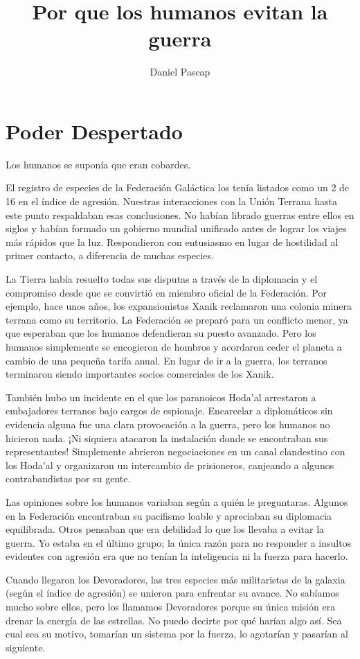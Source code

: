 \documentclass[spanish,12pt,a4paper,oneside,titlepage]{book}
\title{Por que los humanos evitan la guerra}
\author{Daniel Pascap}
\begin{document}
    \maketitle
    \tableofcontents
    \chapter{Poder Despertado}
    Los humanos se suponía que eran cobardes.

    El registro de especies de la Federación Galáctica los tenía listados como un 2 de 16 en el índice de agresión. Nuestras interacciones con la Unión Terrana hasta este punto respaldaban esas conclusiones. No habían librado guerras entre ellos en siglos y habían formado un gobierno mundial unificado antes de lograr los viajes más rápidos que la luz. Respondieron con entusiasmo en lugar de hostilidad al primer contacto, a diferencia de muchas especies.

    La Tierra había resuelto todas sus disputas a través de la diplomacia y el compromiso desde que se convirtió en miembro oficial de la Federación. Por ejemplo, hace unos años, los expansionistas Xanik reclamaron una colonia minera terrana como su territorio. La Federación se preparó para un conflicto menor, ya que esperaban que los humanos defendieran su puesto avanzado. Pero los humanos simplemente se encogieron de hombros y acordaron ceder el planeta a cambio de una pequeña tarifa anual. En lugar de ir a la guerra, los terranos terminaron siendo importantes socios comerciales de los Xanik.

    También hubo un incidente en el que los paranoicos Hoda'al arrestaron a embajadores terranos bajo cargos de espionaje. Encarcelar a diplomáticos sin evidencia alguna fue una clara provocación a la guerra, pero los humanos no hicieron nada. ¡Ni siquiera atacaron la instalación donde se encontraban sus representantes! Simplemente abrieron negociaciones en un canal clandestino con los Hoda'al y organizaron un intercambio de prisioneros, canjeando a algunos contrabandistas por su gente.

    Las opiniones sobre los humanos variaban según a quién le preguntaras. Algunos en la Federación encontraban su pacifismo loable y apreciaban su diplomacia equilibrada. Otros pensaban que era debilidad lo que los llevaba a evitar la guerra. Yo estaba en el último grupo; la única razón para no responder a insultos evidentes con agresión era que no tenían la inteligencia ni la fuerza para hacerlo.

    Cuando llegaron los Devoradores, las tres especies más militaristas de la galaxia (según el índice de agresión) se unieron para enfrentar su avance. No sabíamos mucho sobre ellos, pero los llamamos Devoradores porque su única misión era drenar la energía de las estrellas. No puedo decirte por qué harían algo así. Sea cual sea su motivo, tomarían un sistema por la fuerza, lo agotarían y pasarían al siguiente.
\end{document}

